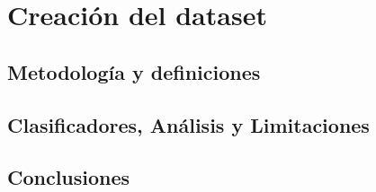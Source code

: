 \documentclass[11pt,a4paper,twoside]{tesis}
\begin{document}
\part{Creación del dataset}

\chapter{Metodología y definiciones}

\chapter{Clasificadores, Análisis y Limitaciones}

\chapter{Conclusiones}


\appendix






\backmatter

\end{document}
